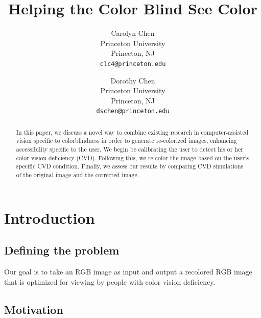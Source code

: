 \documentclass[10pt,twocolumn,letterpaper]{article}
\begin{document}
\title{Helping the Color Blind See Color}

\author{Carolyn Chen\\
Princeton University\\
Princeton, NJ\\
{\tt\small clc4@princeton.edu}
\and
Dorothy Chen\\
Princeton University\\
Princeton, NJ\\
{\tt\small dschen@princeton.edu}
}

\maketitle

\begin{abstract}
   In this paper, we discuss a novel way to combine existing research in computer-assisted vision specific to colorblindness in order to generate re-colorized images, enhancing accessibility specific to the user. We begin be calibrating the user to detect his or her color vision deficiency (CVD). Following this, we re-color the image based on the user’s specific CVD condition. Finally, we assess our results by comparing CVD simulations of the original image and the corrected image. 
\end{abstract}

\section{Introduction}
\subsection{Defining the problem}
Our goal is to take an RGB image as input and output a recolored RGB image that is optimized for viewing by people with color vision deficiency. 

\subsection{Motivation}
\end{document}
